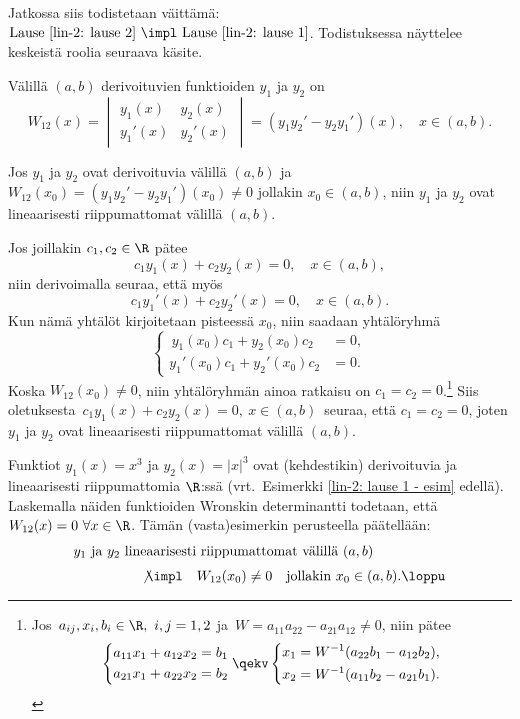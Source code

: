Jatkossa siis todistetaan väittämä: \ 
$\text{Lause \ref{lin-2: lause 2}}\ \impl\ \text{Lause \ref{lin-2: lause 1}}$. Todistuksessa
näyttelee keskeistä roolia seuraava käsite.
\begin{Def}  Välillä $(a,b)$ derivoituvien funktioiden
$y_1$ ja $y_2$ \kor{Wronskin determinantti} on
\[
W_{12}(x)=\begin{vmatrix}
y_1(x) & y_2(x) \\
y_1'(x) & y_2'(x)
\end{vmatrix} = (y_1y_2'-y_2y_1')(x), \quad x\in(a,b).
\]
\end{Def}
\begin{Prop} \label{lin-2: prop} Jos $y_1$ ja $y_2$ ovat derivoituvia välillä $(a,b)$ ja 
$W_{12}(x_0)=(y_1y_2'-y_2y_1')(x_0)\neq 0$ jollakin $x_0\in (a,b)$, niin $y_1$ ja $y_2$ ovat
lineaarisesti riippumattomat välillä $(a,b)$.
\end{Prop}
\tod Jos joillakin $c_1,c_2\in\R$ pätee
\[
c_1y_1(x)+c_2y_2(x)=0,\quad x\in (a,b),
\]
niin derivoimalla seuraa, että myös
\[
c_1y_1'(x)+c_2y_2'(x)=0,\quad x\in (a,b).
\]
Kun nämä yhtälöt kirjoitetaan pisteessä $x_0$, niin saadaan yhtälöryhmä
\[ \left\{ \begin{aligned}
\,y_1(x_0)c_1+y_2(x_0)c_2 &= 0, \\ y_1'(x_0)c_1+y_2'(x_0)c_2 &= 0.
           \end{aligned} \right. \]
Koska $W_{12}(x_0)\neq 0$, niin yhtälöryhmän ainoa ratkaisu on 
$c_1=c_2=0$.\footnote[2]{Jos $\,a_{ij},x_i,b_i\in\R,\ i,j=1,2$ ja 
$\,W=a_{11}a_{22}-a_{21}a_{12} \neq 0$, niin pätee
\[
\left\{ \begin{aligned} 
        a_{11}x_1+a_{12}x_2 &= b_1 \\ a_{21}x_1+a_{22}x_2 &= b_2 
        \end{aligned} \right.
\qekv \left\{ \begin{aligned} 
        x_1 &= W^{-1}(a_{22}b_1-a_{12}b_2), \\ x_2 &= W^{-1}(a_{11}b_2-a_{21}b_1). 
        \end{aligned}\right.
\]}
Siis oletuksesta $\,c_1y_1(x)+c_2y_2(x)=0,\ x\in(a,b)\,$ seuraa, että $c_1=c_2=0$, joten $y_1$
ja $y_2$ ovat lineaarisesti riippumattomat välillä $(a,b)$. \loppu
\begin{Exa} Funktiot $y_1(x)=x^3$ ja $y_2(x)=|x|^3$ ovat (kehdestikin) derivoituvia ja
lineaarisesti riippumattomia $\R$:ssä (vrt.\ Esimerkki \ref{lin-2: lause 1 - esim} edellä).
Laskemalla näiden funktioiden Wronskin determinantti todetaan, että
$W_{12}(x)=0\ \forall x\in\R$. Tämän (vasta)esimerkin perusteella päätellään:
\begin{align*}
&\text{$y_1$ ja $y_2$ lineaarisesti riippumattomat välillä $(a,b)$} \\[1mm]
&\qquad\qquad\ \ \not\impl\quad W_{12}(x_0) \neq 0 \quad \text{jollakin}\ x_0\in(a,b). \loppu
\end{align*}
\end{Exa}
